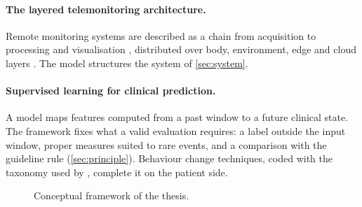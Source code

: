 \paragraph{The layered telemonitoring architecture.} Remote monitoring systems are described as a chain from acquisition to processing and visualisation \parencite{tai2024}, distributed over body, environment, edge and cloud layers \parencite{mucchi2021}. The model structures the system of \cref{sec:system}.

\paragraph{Supervised learning for clinical prediction.} A model maps features computed from a past window to a future clinical state. The framework fixes what a valid evaluation requires: a label outside the input window, proper measures suited to rare events, and a comparison with the guideline rule (\cref{sec:principle}). Behaviour change techniques, coded with the taxonomy used by \textcite{zhou2024}, complete it on the patient side.

\begin{figure}[htbp]
\centering
{}
\caption{Conceptual framework of the thesis.}\label{fig:concept-framework}
\end{figure}

